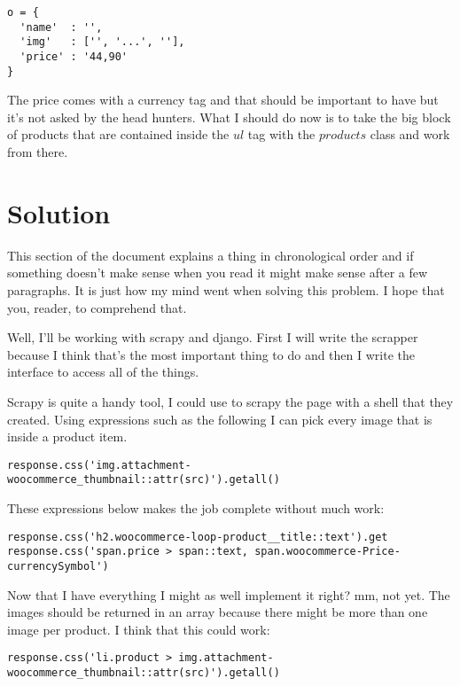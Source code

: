 \documentclass[a4paper, 12pt]{article}
\begin{document}
\begin{verbatim}
o = {
  'name'  : '',
  'img'   : ['', '...', ''],
  'price' : '44,90'
}
\end{verbatim}

The price comes with a currency tag and that should be important to have but
it's not asked by the head hunters. What I should do now is to take the big
block of products that are contained inside the \(ul\) tag with the \(products\)
class and work from there.

\section{Solution}
\label{sec:org3d64be7}

This section of the document explains a thing in chronological order and if
something doesn't make sense when you read it might make sense after a few
paragraphs. It is just how my mind went when solving this problem. I hope
that you, reader, to comprehend that.

Well, I'll be working with scrapy and django. First I will write the scrapper
because I think that's the most important thing to do and then I write the
interface to access all of the things.

Scrapy is quite a handy tool, I could use to scrapy the page with a shell that
they created. Using expressions such as the following I can pick every image
that is inside a product item.

\begin{verbatim}
response.css('img.attachment-woocommerce_thumbnail::attr(src)').getall()
\end{verbatim}

These expressions below makes the job complete without much work:

\begin{verbatim}
response.css('h2.woocommerce-loop-product__title::text').get
response.css('span.price > span::text, span.woocommerce-Price-currencySymbol')
\end{verbatim}

Now that I have everything I might as well implement it right? mm, not yet. The
images should be returned in an array because there might be more than one image
per product. I think that this could work:

\begin{verbatim}
response.css('li.product > img.attachment-woocommerce_thumbnail::attr(src)').getall()
\end{verbatim}
\end{document}
